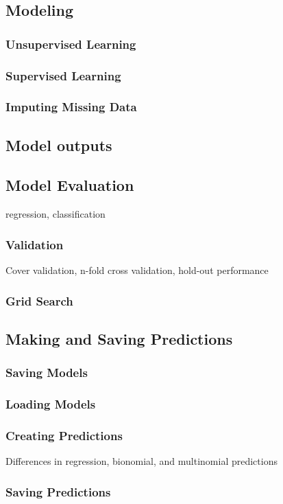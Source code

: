 \subsection{Modeling}
\subsubsection{Unsupervised Learning}
\subsubsection{Supervised Learning}
\subsubsection{Imputing Missing Data}

\subsection{Model outputs}
\subsection{Model Evaluation}
regression, classification
\subsubsection{Validation}
Cover validation, n-fold cross validation, hold-out performance
\subsubsection{Grid Search}

\subsection{Making and Saving Predictions}
\subsubsection{Saving Models}
\subsubsection{Loading Models}
\subsubsection{Creating Predictions}
Differences in regression, bionomial, and multinomial predictions
\subsubsection{Saving Predictions}

